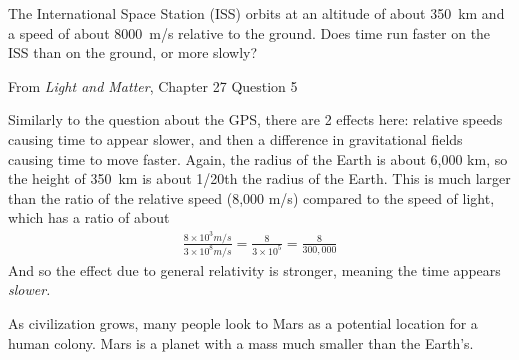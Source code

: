 \documentclass[12pt]{exam}
\begin{document}
\begin{questions}
	
	\question The International Space Station (ISS) orbits at an altitude of about 350~km and a speed of about 8000~m/s relative to the ground. Does time run faster on the ISS than on the ground, or more slowly?
	
	From \textit{Light and Matter}, Chapter 27 Question 5
		\begin{TheSolution}
		Similarly to the question about the GPS, there are 2 effects here: relative speeds causing time to appear slower, and then a difference in gravitational fields causing time to move faster. Again, the radius of the Earth is about 6,000 km, so the height of 350~km is about 1/20th the radius of the Earth. This is much larger than the ratio of the relative speed (8,000 m/s) compared to the speed of light, which has a ratio of about
		\begin{eqnarray}
		\frac{8\times 10^3 m/s}{3\times 10^8 m/s} = \frac{8}{3\times 10^5} = \frac{8}{300,000} \nonumber
		\end{eqnarray}
		And so the effect due to general relativity is stronger, meaning the time appears \textit{slower.}
		\end{TheSolution}
		
	\question As civilization grows, many people look to Mars as a potential location for a human colony. Mars is a planet with a mass much smaller than the Earth's.
\end{questions}
\end{document}
